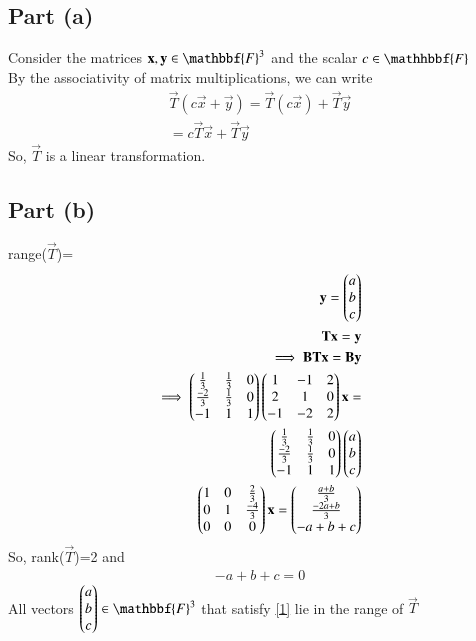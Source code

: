 \documentclass[journal,12pt,twocolumn]{IEEEtran}
\begin{document}
\subsection{Part (a)}
Consider the matrices $\vec{x},\vec{y} \in \mathbbf{F}^3$ and the scalar $c \in \mathhbbf{F}$\\
By the associativity of matrix multiplications, we can write
\begin{align}
    \vec{T}(c\vec{x}+\vec{y})=\vec{T}(c\vec{x})+\vec{T}\vec{y}\\
    =c\vec{T}\vec{x}+\vec{T}\vec{y}
\end{align}
So, $\vec{T}$ is a linear transformation.
\subsection{Part (b)}
range($\vec{T}$)=
\begin{align}
    \mathbf{y}=\begin{pmatrix}a\\b\\c\end{pmatrix}\\
    \mathbf{T}\mathbf{x}=\mathbf{y}\\
    \implies \mathbf{B}\mathbf{T}\mathbf{x}=\mathbf{B}\mathbf{y}\\
    \implies \begin{pmatrix}\frac{1}{3}&\frac{1}{3}&0\\\frac{-2}{3}&\frac{1}{3}&0\\-1&1&1\end{pmatrix}\begin{pmatrix}1&-1&2\\2&1&0\\-1&-2&2\end{pmatrix}\mathbf{x}=\\ \begin{pmatrix}\frac{1}{3}&\frac{1}{3}&0\\\frac{-2}{3}&\frac{1}{3}&0\\-1&1&1\end{pmatrix}\begin{pmatrix}a\\b\\c\end{pmatrix}\\
    \begin{pmatrix}1&0&\frac{2}{3}\\0&1&\frac{-4}{3}\\0&0&0\end{pmatrix}\mathbf{x}=\begin{pmatrix}\frac{a+b}{3}\\\frac{-2a+b}{3}\\-a+b+c\end{pmatrix}
\end{align}
So, rank($\vec{T}$)=2 and 
\begin{align}
  -a+b+c=0 \label{1} 
\end{align}
All vectors $\myvec{a\\b\\c} \in \mathbbf{F}^3$ that satisfy \eqref{1} lie in the range of $\vec{T}$
\end{document}

